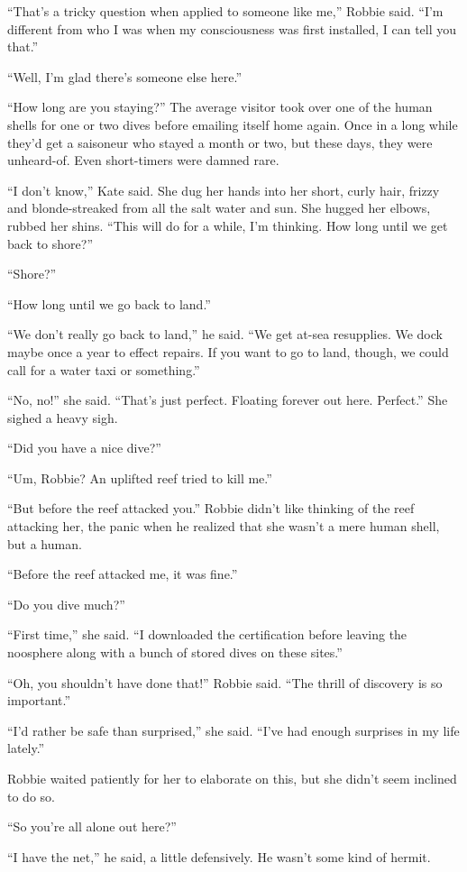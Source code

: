 “That’s a tricky question when applied to someone like me,” Robbie
said. “I’m different from who I was when my consciousness was first
installed, I can tell you that.”

“Well, I’m glad there’s someone else here.”

“How long are you staying?” The average visitor took over one of
the human shells for one or two dives before emailing itself home
again. Once in a long while they’d get a saisoneur who stayed a
month or two, but these days, they were unheard-of. Even
short-timers were damned rare.

“I don’t know,” Kate said. She dug her hands into her short, curly
hair, frizzy and blonde-streaked from all the salt water and sun.
She hugged her elbows, rubbed her shins. “This will do for a while,
I’m thinking. How long until we get back to shore?”

“Shore?”

“How long until we go back to land.”

“We don’t really go back to land,” he said. “We get at-sea
resupplies. We dock maybe once a year to effect repairs. If you
want to go to land, though, we could call for a water taxi or
something.”

“No, no!” she said. “That’s just perfect. Floating forever out
here. Perfect.” She sighed a heavy sigh.

“Did you have a nice dive?”

“Um, Robbie? An uplifted reef tried to kill me.”

“But before the reef attacked you.” Robbie didn’t like thinking of
the reef attacking her, the panic when he realized that she wasn’t
a mere human shell, but a human.

“Before the reef attacked me, it was fine.”

“Do you dive much?”

“First time,” she said. “I downloaded the certification before
leaving the noosphere along with a bunch of stored dives on these
sites.”

“Oh, you shouldn’t have done that!” Robbie said. “The thrill of
discovery is so important.”

“I’d rather be safe than surprised,” she said. “I’ve had enough
surprises in my life lately.”

Robbie waited patiently for her to elaborate on this, but she
didn’t seem inclined to do so.

“So you’re all alone out here?”

“I have the net,” he said, a little defensively. He wasn’t some
kind of hermit.

